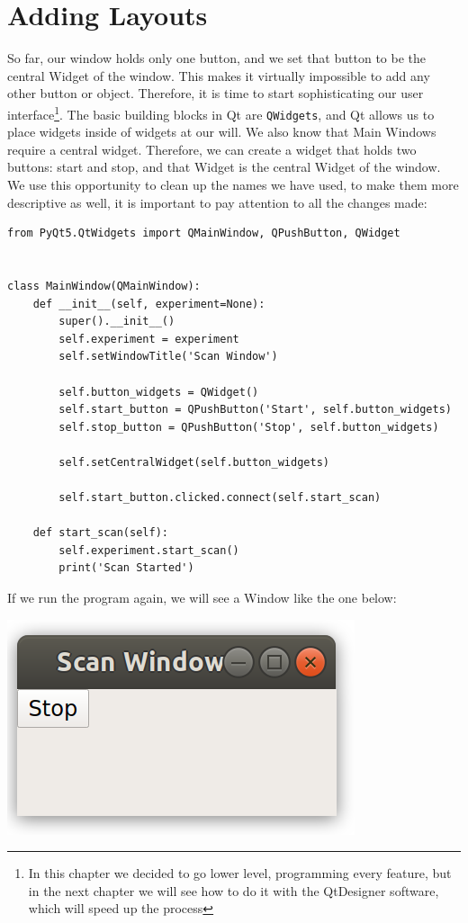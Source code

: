 \section{Adding Layouts}\label{sec:adding-layouts}
So far, our window holds only one button, and we set that button to be the central Widget of the window. This makes it virtually impossible to add any other button or object. Therefore, it is time to start sophisticating our user interface\footnote{In this chapter we decided to go lower level, programming every feature, but in the next chapter we will see how to do it with the QtDesigner software, which will speed up the process}. The basic building blocks in Qt are \texttt{QWidgets}, and Qt allows us to place widgets inside of widgets at our will. We also know that Main Windows require a central widget. Therefore, we can create a widget that holds two buttons: start and stop, and that Widget is the central Widget of the window. We use this opportunity to clean up the names we have used, to make them more descriptive as well, it is important to pay attention to all the changes made:

\begin{verbatim}
from PyQt5.QtWidgets import QMainWindow, QPushButton, QWidget


class MainWindow(QMainWindow):
    def __init__(self, experiment=None):
        super().__init__()
        self.experiment = experiment
        self.setWindowTitle('Scan Window')

        self.button_widgets = QWidget()
        self.start_button = QPushButton('Start', self.button_widgets)
        self.stop_button = QPushButton('Stop', self.button_widgets)

        self.setCentralWidget(self.button_widgets)

        self.start_button.clicked.connect(self.start_scan)

    def start_scan(self):
        self.experiment.start_scan()
        print('Scan Started')
\end{verbatim}

If we run the program again, we will see a Window like the one below:

\begin{center}
    \includegraphics[width=.3\textwidth]{images/Chapter_08/05_window_without_layout.png}
\end{center}

